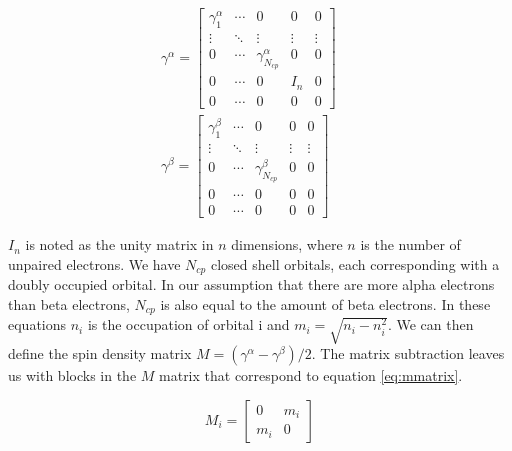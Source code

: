 \documentclass[twoside,twocolumn,9pt]{article}
\begin{document}
\begin{subequations}
  \begin{align}
    \label{eq:gammaafull}
    \gamma^\alpha = \begin{bmatrix}
      \gamma^\alpha_1 & \cdots & 0                      & 0      & 0      \\
      \vdots          & \ddots & \vdots                 & \vdots & \vdots \\
      0               & \cdots & \gamma^\alpha_{N_{cp}} & 0      & 0      \\
      0               & \cdots & 0                      & I_n    & 0      \\
      0               & \cdots & 0                      & 0      & 0
    \end{bmatrix} &  & \\
    \label{eq:gammabfull}
    \gamma^\beta = \begin{bmatrix}
      \gamma^\beta_1 & \cdots & 0                     & 0      & 0      \\
      \vdots         & \ddots & \vdots                & \vdots & \vdots \\
      0              & \cdots & \gamma^\beta_{N_{cp}} & 0      & 0      \\
      0              & \cdots & 0                     & 0      & 0      \\
      0              & \cdots & 0                     & 0      & 0
    \end{bmatrix}  &  &
  \end{align}
\end{subequations}

$I_n$ is noted as the unity matrix in $n$ dimensions, where $n$ is the number of unpaired electrons. We have $N_{cp}$ closed shell orbitals, each corresponding with a doubly occupied
orbital. In our assumption that there are more alpha electrons than beta electrons, $N_{cp}$ is also equal to the amount of beta electrons.
In these equations $n_i$ is the occupation of orbital i and $m_i = \sqrt{n_i - n_i^2}$\cite{Scuseria2010}. We can then define the spin density matrix
$M = (\gamma^\alpha - \gamma^\beta)/2$. The matrix subtraction leaves us with blocks in the $M$ matrix that correspond to equation \eqref{eq:mmatrix}.

\begin{equation}\label{eq:mmatrix}
  M_i = \begin{bmatrix}
    0   & m_i \\
    m_i & 0
  \end{bmatrix}
\end{equation}
\end{document}
